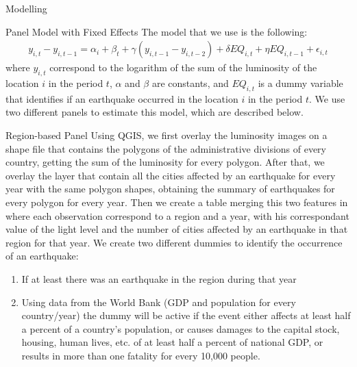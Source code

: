 \documentclass[12.5pt,fleqn,leqno,letterpaper]{article}
\begin{document}
\begin{section}{Modelling}
  \begin{subsection}{Panel Model with Fixed Effects}
    The model that we use is the following:
    \begin{align*}
      y_{i,t}-y_{i,t-1}=\alpha_i+\beta_t+\gamma(y_{i,t-1}-y_{i,t-2})+\delta EQ_{i,t}+\eta EQ_{i,t-1}+\epsilon_{i,t}
    \end{align*}      
    where $y_{i,t}$ correspond to the logarithm of the sum of the luminosity of the location $i$ in the period $t$, $\alpha$ and $\beta$ are constants, and $EQ_{i,t}$ is a dummy variable that identifies if an earthquake occurred in the location $i$ in the period $t$. We use two different panels to estimate this model, which are described below.
    \begin{subsubsection}{Region-based Panel}
      Using QGIS, we first overlay the luminosity images on a shape file that contains the polygons of the administrative divisions of every country, getting the sum of the luminosity for every polygon. After that, we overlay the layer that contain all the cities affected by an earthquake for every year with the same polygon shapes, obtaining the summary of earthquakes for every polygon for every year. Then we create a table merging this two features in where each observation correspond to a region and a year, with his correspondant value of the light level and the number of cities affected by an earthquake in that region for that year. We create two different dummies to identify the occurrence of an earthquake:
      \begin{enumerate}
        \item If at least there was an earthquake in the region during that year
        \item Using data from the World Bank (GDP and population for every country/year) the dummy will be active if the event either affects at least half a percent of a country's
          population, or causes damages to the capital stock, housing, human lives, etc. of at least half a percent of national GDP, or results in more than one fatality for every 10,000 people.
      \end{enumerate}
    \end{subsubsection}


\end{subsection}
\end{section}
\end{document}
